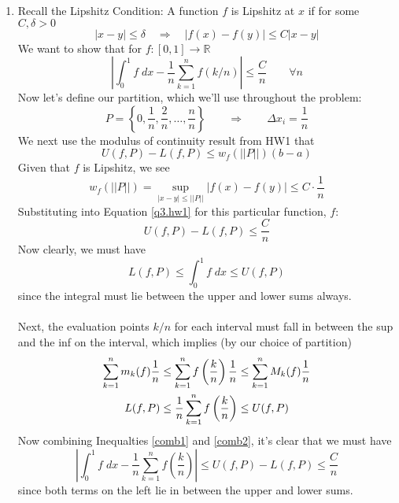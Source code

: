 \documentclass[12pt]{article}
\theoremstyle{plain}
\theoremstyle{definition}
\theoremstyle{remark}
\begin{document}
\begin{enumerate}
\newpage
\item Recall the Lipshitz Condition: A function $f$ is Lipshitz at $x$ if for some $C, \delta >0$
\begin{equation}
    |x-y| \leq \delta \quad \Rightarrow \quad
    |f(x) - f(y)| \leq C|x-y|
\end{equation}
We want to show that for $f: [0,1] \rightarrow \mathbb{R}$
\begin{equation}
    \label{q3.torewrite}
    \left\lvert \int^1_0 f \; dx - \frac{1}{n} \sum^n_{k=1}
        f(k/n) \right\rvert \leq \frac{C}{n} \qquad \forall n
\end{equation}
Now let's define our partition, which we'll use throughout the problem:
\begin{equation}
    P = \left\{ 0, \frac{1}{n},\frac{2}{n}, \ldots,\frac{n}{n}\right\}
    \qquad \Rightarrow \qquad
    \Delta x_i = \frac{1}{n}
\end{equation}
We next use the modulus of continuity result from HW1 that 
\begin{equation}
    \label{q3.hw1}
    U(f,P) - L(f,P) \leq w_f\left(||P||\right) (b-a) 
\end{equation}
Given that $f$ is Lipshitz, we see
    \[ w_f\left(||P||\right) = \sup_{|x-y|\leq ||P||}
        |f(x) - f(y)| \leq C \cdot \frac{1}{n} \]
Substituting into Equation \ref{q3.hw1} for this particular function, $f$:
    \[ U(f,P) - L(f,P) \leq \frac{C}{n} \]
Now clearly, we must have 
\begin{equation}
    \label{comb1}
     L(f,P) \leq \int^1_0 f \; dx \leq U(f,P) 
\end{equation}
since the integral must lie between the upper and lower sums always.
\\
\\
Next, the evaluation points $k/n$ for each interval must fall in between the sup and the inf on the interval, which implies (by our choice of partition)
\begin{align}
    \sum^n_{k=1} m_k(f) \frac{1}{n} 
        &\leq \sum^n_{k=1} f\left(\frac{k}{n}
        \right) \frac{1}{n} \leq 
        \sum^n_{k=1} M_k(f) \frac{1}{n}  \notag \\
    L(f,P) &\leq \frac{1}{n} \sum^n_{k=1} f\left(\frac{k}{n}
        \right) \leq U(f,P) \label{comb2}
\end{align}
Now combining Inequalties \ref{comb1} and \ref{comb2}, it's clear that we must have
    \[ \left\lvert \int^1_0 f \; dx -  
        \frac{1}{n} \sum^n_{k=1} f\left(\frac{k}{n} \right) 
        \right\rvert\leq 
        U(f,P) - L(f,P) \leq \frac{C}{n} \]
since both terms on the left lie in between the upper and lower sums.


\end{enumerate}
\end{document}

